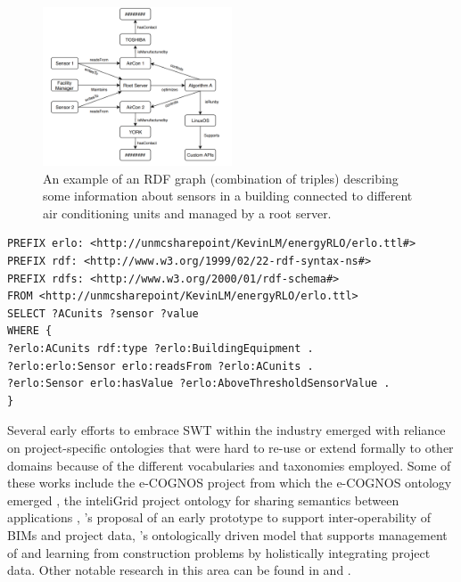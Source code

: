 \begin{figure}[!t]
	\centering
	\includegraphics[width=0.5\textwidth]{figures/RDFgraph}
	\caption{An example of an RDF graph (combination of triples) describing some information about sensors in a building connected to different air conditioning units and managed by a root server.} 
	\label{RDF graph}
\end{figure}


\begin{lstlisting}[captionpos=b, caption=A basic SPARQL query retrieving AC units whose sensor value is above a certain set threshold. No specific query modifiers have been defined, label=lst:sparql,
basicstyle=\ttfamily\small,frame=single]
PREFIX erlo: <http://unmcsharepoint/KevinLM/energyRLO/erlo.ttl#>
PREFIX rdf: <http://www.w3.org/1999/02/22-rdf-syntax-ns#>
PREFIX rdfs: <http://www.w3.org/2000/01/rdf-schema#>
FROM <http://unmcsharepoint/KevinLM/energyRLO/erlo.ttl>
SELECT ?ACunits ?sensor ?value
WHERE {
?erlo:ACunits rdf:type ?erlo:BuildingEquipment .
?erlo:erlo:Sensor erlo:readsFrom ?erlo:ACunits .
?erlo:Sensor erlo:hasValue ?erlo:AboveThresholdSensorValue .
} 
\end{lstlisting} 

Several early efforts to embrace \ac{SWT} within the industry emerged with reliance on project-specific ontologies that were hard to re-use or extend formally to other domains because of the different vocabularies and taxonomies employed. Some of these works include the e-COGNOS project from which the e-COGNOS ontology emerged \citep{Wetherill2002}, the inteliGrid project ontology for sharing semantics between applications \citep{Dolenc2007}, \cite{Yang2006}'s proposal of an early prototype to support inter-operability of \acp{BIM} and project data, \cite{Elghamrawy2008,Elghamrawy2010}'s ontologically driven model that supports management of and learning from construction problems by holistically integrating project data. Other notable research in this area can be found in \cite{Abdul-Ghafour2007, Le2016, Pauwels2010, Scherer2012, Shah2011} and \cite{Venugopal2015}.

